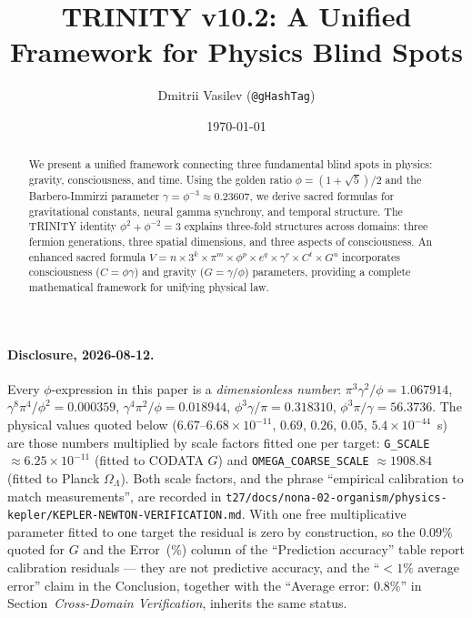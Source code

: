 \documentclass[12pt,a4paper]{article}
\title{TRINITY v10.2: A Unified Framework for Physics Blind Spots}
\author{Dmitrii Vasilev (\texttt{@gHashTag})}
\date{\today}
\begin{document}
\maketitle

\begin{abstract}
We present a unified framework connecting three fundamental blind spots in physics: gravity, consciousness, and time. Using the golden ratio $\phi = (1+\sqrt{5})/2$ and the Barbero-Immirzi parameter $\gamma = \phi^{-3} \approx 0.23607$, we derive sacred formulas for gravitational constants, neural gamma synchrony, and temporal structure. The TRINITY identity $\phi^2 + \phi^{-2} = 3$ explains three-fold structures across domains: three fermion generations, three spatial dimensions, and three aspects of consciousness. An enhanced sacred formula $V = n \times 3^k \times \pi^m \times \phi^p \times e^q \times \gamma^r \times C^t \times G^u$ incorporates consciousness ($C = \phi\gamma$) and gravity ($G = \gamma/\phi$) parameters, providing a complete mathematical framework for unifying physical law.
\end{abstract}

\paragraph{Disclosure, 2026-08-12.} Every $\phi$-expression in this paper is a \emph{dimensionless number}: $\pi^3\gamma^2/\phi = 1.067914$, $\gamma^8\pi^4/\phi^2 = 0.000359$, $\gamma^4\pi^2/\phi = 0.018944$, $\phi^3\gamma/\pi = 0.318310$, $\phi^3\pi/\gamma = 56.3736$. The physical values quoted below ($6.67$--$6.68\times10^{-11}$, $0.69$, $0.26$, $0.05$, $5.4\times10^{-44}$~s) are those numbers multiplied by scale factors fitted one per target: \texttt{G\_SCALE} $\approx 6.25\times10^{-11}$ (fitted to CODATA $G$) and \texttt{OMEGA\_COARSE\_SCALE} $\approx 1908.84$ (fitted to Planck $\Omega_\Lambda$). Both scale factors, and the phrase ``empirical calibration to match measurements'', are recorded in \texttt{t27/docs/nona-02-organism/physics-kepler/KEPLER-NEWTON-VERIFICATION.md}. With one free multiplicative parameter fitted to one target the residual is zero by construction, so the $0.09\%$ quoted for $G$ and the Error~(\%) column of the ``Prediction accuracy'' table report calibration residuals --- they are not predictive accuracy, and the ``$<1\%$ average error'' claim in the Conclusion, together with the ``Average error: $0.8\%$'' in Section~\emph{Cross-Domain Verification}, inherits the same status.
\end{document}
